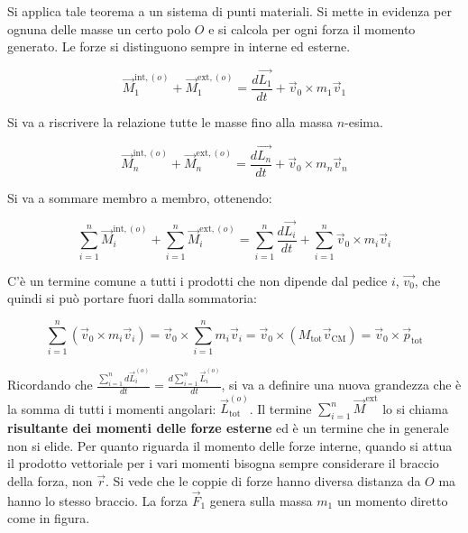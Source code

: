 \begin{figure}[htpb]
\end{figure}
\FloatBarrier
Si applica tale teorema a un sistema di punti materiali. Si mette in evidenza per ognuna delle masse un certo polo $O$ e si calcola per ogni forza il momento generato. Le forze si distinguono sempre in interne ed esterne.

\[
	\vec{M}_1^{\text{int}, (o)}+\vec{M}_1^{\text{ext}, (o)}=\frac{d\vec{L_1}}{dt}+\vec{v}_0\times m_1\vec{v}_1
\]

Si va a riscrivere la relazione tutte le masse fino alla massa $n$-esima.

\[
	\vec{M}_n^{\text{int}, (o)}+\vec{M}_n^{\text{ext}, (o)}=\frac{d\vec{L_n}}{dt}+\vec{v}_0\times m_n\vec{v}_n
\]

Si va a sommare membro a membro, ottenendo:

\[
	\sum_{i=1}^n \vec{M}_i^{\text{int}, (o)}+\sum_{i=1}^n \vec{M}_i^{\text{ext}, (o)}=\sum_{i=1}^n \frac{d\vec{L_i}}{dt}+\sum_{i=1}^n \vec{v}_0\times m_i\vec{v}_i
\]

C'è un termine comune a tutti i prodotti che non dipende dal pedice $i$, $\vec{v_0}$, che quindi si può portare fuori dalla sommatoria:

\begin{equation}
	\label{ciao}
	\sum_{i=1}^n(\vec{v}_0\times m_i\vec{v}_i)=\vec{v}_0 \times \sum_{i=1}^nm_i\vec{v}_i=\vec{v}_0\times (M_\text{tot}\vec{v}_\text{CM})=\vec v_0\times \vec p_\text{tot}
\end{equation}

Ricordando che $\frac{\sum_{i=1}^nd\vec{L}_i^{(o)}}{dt}=\frac{d\sum_{i=1}^n \vec{L}_i^{(o)}}{dt}$, si va a definire una nuova grandezza che è la somma di tutti i momenti angolari: $\vec{L}_\text{tot}^{(o)}$.
Il termine $\sum_{i=1}^n \vec{M}^\text{ext}$ lo si chiama \textbf{risultante dei momenti delle forze esterne} ed è un termine che in generale non si elide. Per quanto riguarda il momento delle forze interne, quando si attua il prodotto vettoriale per i vari momenti bisogna sempre considerare il braccio della forza, non $\vec{r}$. Si vede che le coppie di forze hanno diversa distanza da $O$ ma hanno lo stesso braccio. La forza $\vec{F}_1$ genera sulla massa $m_1$ un momento diretto come in figura.

